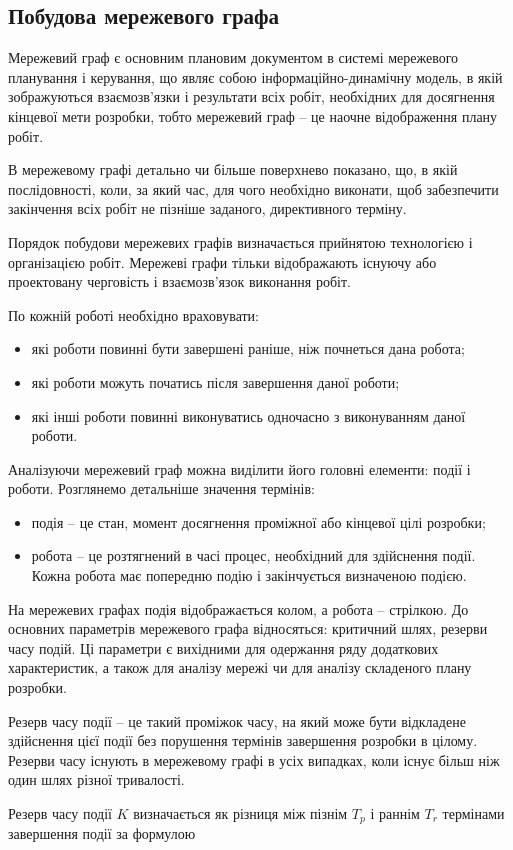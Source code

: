 \subsection{Побудова мережевого графа}
Мережевий граф є основним плановим документом в системі мережевого планування і керування, що являє собою інформаційно-динамічну модель, в якій зображуються взаємозв'язки і результати всіх робіт, необхідних для досягнення кінцевої мети розробки, тобто мережевий граф -- це наочне відображення плану робіт.
\par В мережевому графі детально чи більше поверхнево показано, що, в якій послідовності, коли, за який час, для чого необхідно виконати, щоб забезпечити закінчення всіх робіт не пізніше заданого, директивного терміну.
\par Порядок побудови мережевих графів визначається прийнятою технологією і організацією робіт. Мережеві графи тільки відображають існуючу або проектовану черговість і взаємозв'язок виконання робіт.
\par По кожній роботі необхідно враховувати:
\begin{itemize}
	\item які роботи повинні бути завершені раніше, ніж почнеться дана робота;
	\item які роботи можуть початись після завершення даної роботи;
	\item які інші роботи повинні виконуватись одночасно з виконуванням даної роботи.
\end{itemize}
\par Аналізуючи мережевий граф можна виділити його головні елементи: події і роботи. Розглянемо детальніше значення термінів:
\begin{itemize}
	\item подія -- це стан, момент досягнення проміжної або кінцевої цілі розробки;
	\item робота -- це розтягнений в часі процес, необхідний для здійснення події. Кожна робота має попередню подію і закінчується визначеною подією.
\end{itemize}

\par На мережевих графах подія відображається колом, а робота -- стрілкою. До основних параметрів мережевого графа відносяться: критичний шлях, резерви часу подій. Ці параметри є вихідними для одержання ряду додаткових характеристик, а також для аналізу мережі чи для аналізу складеного плану розробки.
\par Резерв часу події -- це такий проміжок часу, на який може бути відкладене здійснення цієї події без порушення термінів завершення розробки в цілому. Резерви часу існують в мережевому графі в усіх випадках, коли існує більш ніж один шлях різної тривалості.
\par Резерв часу події $K$ визначається як різниця між пізнім $T_{p}$ і раннім $T_{r}$ термінами завершення події за формулою

